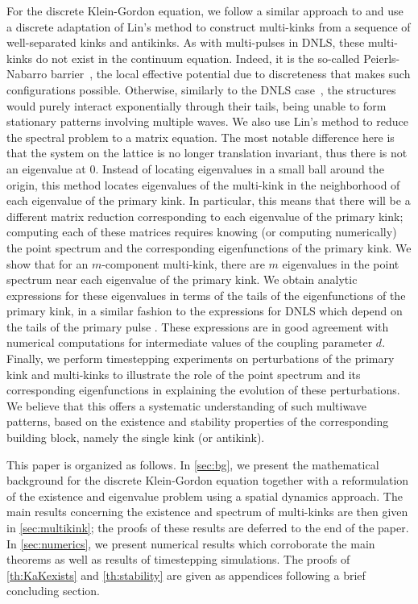 \documentclass[12pt,reqno]{amsart}
\begin{document}
For the discrete Klein-Gordon equation, we follow a similar approach to \cite{Parker2020} and use a discrete adaptation of Lin's method \cite{Knobloch2000} to construct multi-kinks from a sequence of well-separated kinks and antikinks. As with multi-pulses in DNLS, these multi-kinks do not exist in the continuum equation. 
Indeed, it is the so-called Peierls-Nabarro barrier~\cite{peyrard}, the
local effective potential due to discreteness that makes
such configurations possible. Otherwise, similarly to the
DNLS case~\cite{Kapitula2001a}, the structures would purely 
interact exponentially through their tails, being unable
to form stationary patterns involving multiple waves.
We also use Lin's method to reduce the spectral problem to a matrix equation. The most notable difference here is that the system on the lattice is no longer translation invariant, thus there is not an eigenvalue at 0. Instead of locating eigenvalues in a small ball around the origin, this method locates eigenvalues of the multi-kink in the neighborhood of each eigenvalue of the primary kink. In particular, this means that there will be a different matrix reduction corresponding to each eigenvalue of the primary kink; computing each of these matrices requires knowing (or computing numerically) the point spectrum and the corresponding eigenfunctions of the primary kink. We show that for an $m$-component multi-kink, there are $m$ eigenvalues in the point spectrum near each eigenvalue of the primary kink. We obtain analytic expressions for these eigenvalues in terms of the tails of the eigenfunctions of the primary kink, in a similar fashion to the expressions for DNLS which depend on the tails of the primary pulse \cite{Parker2020}. These expressions are in good agreement with numerical computations for intermediate values of the coupling parameter $d$. Finally, we perform timestepping experiments on perturbations of the primary kink and multi-kinks to illustrate the role of the point spectrum and its corresponding eigenfunctions in explaining the evolution of these perturbations. We believe that this offers a 
systematic understanding of such multiwave patterns, based
on the existence and stability properties of the corresponding
building block, namely the single kink (or antikink).

This paper is organized as follows. In \cref{sec:bg}, we present the mathematical background for the discrete Klein-Gordon equation together with a reformulation of the existence and eigenvalue problem using a spatial dynamics approach. The main results concerning the existence and spectrum of multi-kinks are then given in \cref{sec:multikink}; the proofs of these results are deferred to the end of the paper. In \cref{sec:numerics}, we present numerical results which corroborate the main theorems as well as results of timestepping simulations. The proofs of \cref{th:KaKexists} and \cref{th:stability} are given as appendices following a brief concluding section.
\end{document}
